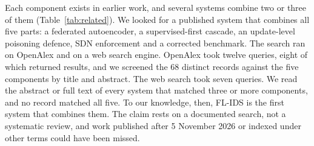 Each component exists in earlier work, and several systems combine two or three of them (Table~\ref{tab:related}). We looked for a published system that combines all five parts: a federated autoencoder, a supervised-first cascade, an update-level poisoning defence, SDN enforcement and a corrected benchmark. The search ran on OpenAlex and on a web search engine. OpenAlex took twelve queries, eight of which returned results, and we screened the 68 distinct records against the five components by title and abstract. The web search took seven queries. We read the abstract or full text of every system that matched three or more components, and no record matched all five. To our knowledge, then, FL-IDS is the first system that combines them. The claim rests on a documented search, not a systematic review, and work published after 5 November 2026 or indexed under other terms could have been missed.
